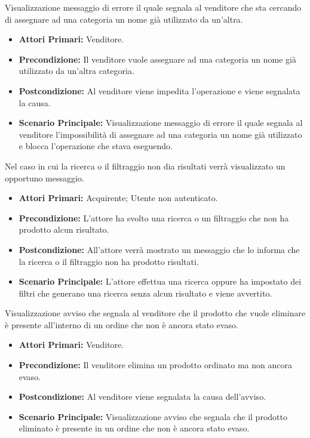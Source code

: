 Visualizzazione messaggio di errore il quale segnala al venditore che sta cercando di assegnare ad una categoria un nome già utilizzato da un'altra.
\begin{itemize}
    \item \textbf{Attori Primari:} Venditore.
    \item \textbf{Precondizione:} Il venditore vuole assegnare ad una categoria un nome già utilizzato da un'altra categoria.
    \item \textbf{Postcondizione:} Al venditore viene impedita l'operazione e viene segnalata la causa.
    \item \textbf{Scenario Principale:} Visualizzazione messaggio di errore il quale segnala al venditore l'impossibilità di assegnare ad una categoria un nome già utilizzato e blocca l'operazione che stava eseguendo.
\end{itemize}


Nel caso in cui la ricerca o il filtraggio non dia risultati verrà visualizzato un opportuno messaggio.
\begin{itemize}
	\item \textbf{Attori Primari:} Acquirente; Utente non autenticato. 
	\item \textbf{Precondizione:} L'attore ha svolto una ricerca o un filtraggio che non ha prodotto alcun risultato.
	\item \textbf{Postcondizione:} All'attore verrà mostrato un messaggio che lo informa che la ricerca o il filtraggio non ha prodotto risultati.
	\item \textbf{Scenario Principale:} L'attore effettua una ricerca oppure ha impostato dei filtri che generano una ricerca senza alcun risultato e viene avvertito.
\end{itemize}

Visualizzazione avviso che segnala al venditore che il prodotto che vuole eliminare è presente all'interno di un ordine che non è ancora stato evaso.
\begin{itemize}
    \item \textbf{Attori Primari:} Venditore.
    \item \textbf{Precondizione:} Il venditore elimina un prodotto ordinato ma non ancora evaso.
    \item \textbf{Postcondizione:} Al venditore viene segnalata la causa dell'avviso.
    \item \textbf{Scenario Principale:} Visualizzazione avviso che segnala che il prodotto eliminato è presente in un ordine che non è ancora stato evaso.
\end{itemize}
